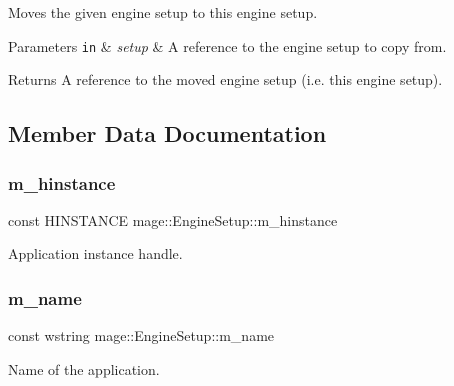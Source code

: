 Moves the given engine setup to this engine setup.


\begin{DoxyParams}[1]{Parameters}
\mbox{\tt in}  & {\em setup} & A reference to the engine setup to copy from. \\
\hline
\end{DoxyParams}
\begin{DoxyReturn}{Returns}
A reference to the moved engine setup (i.\+e. this engine setup). 
\end{DoxyReturn}


\subsection{Member Data Documentation}
\hypertarget{structmage_1_1_engine_setup_a678360078479bc3fee6bed4617caebbf}{}\label{structmage_1_1_engine_setup_a678360078479bc3fee6bed4617caebbf} 
\subsubsection{\texorpdfstring{m\+\_\+hinstance}{m\_hinstance}}
{\footnotesize\ttfamily const H\+I\+N\+S\+T\+A\+N\+CE mage\+::\+Engine\+Setup\+::m\+\_\+hinstance\hspace{0.3cm}{\ttfamily [private]}}

Application instance handle. \hypertarget{structmage_1_1_engine_setup_a40fba981d4b1c30eff304b029a013009}{}\label{structmage_1_1_engine_setup_a40fba981d4b1c30eff304b029a013009} 
\subsubsection{\texorpdfstring{m\+\_\+name}{m\_name}}
{\footnotesize\ttfamily const wstring mage\+::\+Engine\+Setup\+::m\+\_\+name\hspace{0.3cm}{\ttfamily [private]}}

Name of the application. 